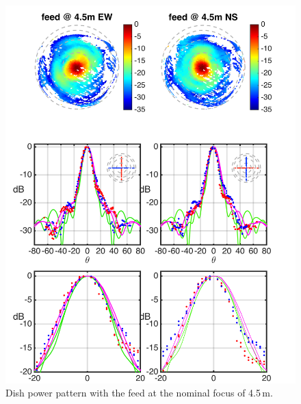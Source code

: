 \documentclass{emulateapj}
\begin{document}
\begin{figure}[h]
\includegraphics[width=6.5in]{dish1_abs_old_ref_model.png}
\caption{Dish power pattern with the feed at the nominal focus of 4.5\,m.}
\label{fig:dish1}
\end{figure}
\end{document}
